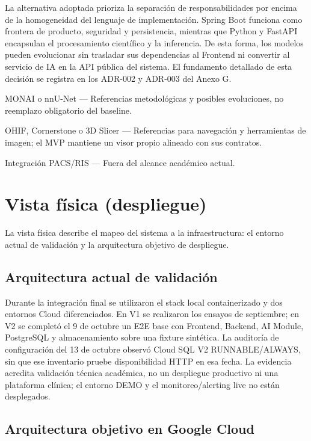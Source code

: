 La alternativa adoptada prioriza la separación de responsabilidades por encima de la homogeneidad del lenguaje de implementación. Spring Boot funciona como frontera de producto, seguridad y persistencia, mientras que Python y FastAPI encapsulan el procesamiento científico y la inferencia. De esta forma, los modelos pueden evolucionar sin trasladar sus dependencias al Frontend ni convertir al servicio de IA en la API pública del sistema. El fundamento detallado de esta decisión se registra en los ADR-002 y ADR-003 del Anexo G.

MONAI o nnU-Net — Referencias metodológicas y posibles evoluciones, no reemplazo obligatorio del baseline.

OHIF, Cornerstone o 3D Slicer — Referencias para navegación y herramientas de imagen; el MVP mantiene un visor propio alineado con sus contratos.

Integración PACS/RIS — Fuera del alcance académico actual.

\section{Vista física (despliegue)}

La vista física describe el mapeo del sistema a la infraestructura: el entorno actual de validación y la arquitectura objetivo de despliegue.

\subsection{Arquitectura actual de validación}

Durante la integración final se utilizaron el stack local containerizado y dos entornos Cloud diferenciados. En V1 se realizaron los ensayos de septiembre; en V2 se completó el 9 de octubre un E2E base con Frontend, Backend, AI Module, PostgreSQL y almacenamiento sobre una fixture sintética. La auditoría de configuración del 13 de octubre observó Cloud SQL V2 RUNNABLE/ALWAYS, sin que ese inventario pruebe disponibilidad HTTP en esa fecha. La evidencia acredita validación técnica académica, no un despliegue productivo ni una plataforma clínica; el entorno DEMO y el monitoreo/alerting live no están desplegados.

\subsection{Arquitectura objetivo en Google Cloud}

